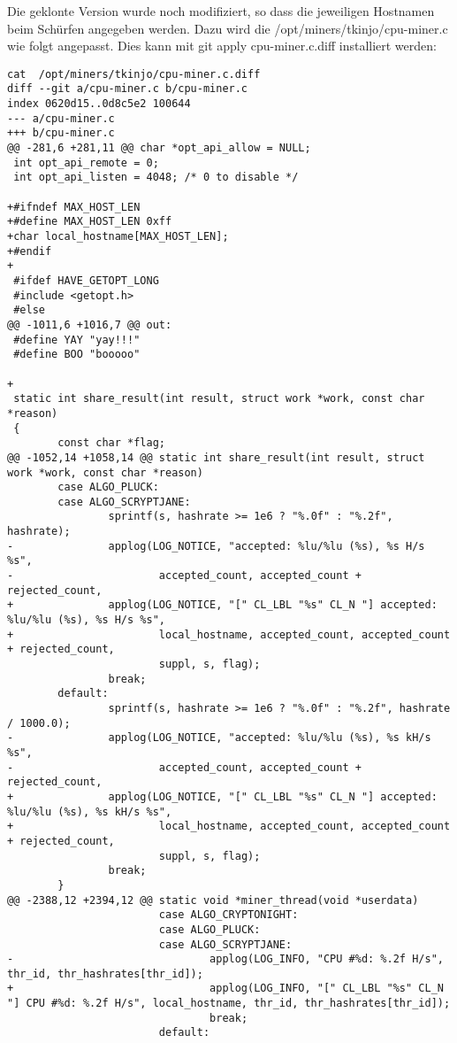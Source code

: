 Die geklonte Version wurde noch modifiziert, so dass die jeweiligen Hostnamen beim Schürfen angegeben werden. Dazu wird die /opt/miners/tkinjo/cpu-miner.c wie folgt angepasst. Dies kann mit git apply cpu-miner.c.diff installiert werden:
\begin{lstlisting}
cat  /opt/miners/tkinjo/cpu-miner.c.diff
diff --git a/cpu-miner.c b/cpu-miner.c
index 0620d15..0d8c5e2 100644
--- a/cpu-miner.c
+++ b/cpu-miner.c
@@ -281,6 +281,11 @@ char *opt_api_allow = NULL;
 int opt_api_remote = 0;
 int opt_api_listen = 4048; /* 0 to disable */

+#ifndef MAX_HOST_LEN
+#define MAX_HOST_LEN 0xff
+char local_hostname[MAX_HOST_LEN];
+#endif
+
 #ifdef HAVE_GETOPT_LONG
 #include <getopt.h>
 #else
@@ -1011,6 +1016,7 @@ out:
 #define YAY "yay!!!"
 #define BOO "booooo"

+
 static int share_result(int result, struct work *work, const char *reason)
 {
        const char *flag;
@@ -1052,14 +1058,14 @@ static int share_result(int result, struct work *work, const char *reason)
        case ALGO_PLUCK:
        case ALGO_SCRYPTJANE:
                sprintf(s, hashrate >= 1e6 ? "%.0f" : "%.2f", hashrate);
-               applog(LOG_NOTICE, "accepted: %lu/%lu (%s), %s H/s %s",
-                       accepted_count, accepted_count + rejected_count,
+               applog(LOG_NOTICE, "[" CL_LBL "%s" CL_N "] accepted: %lu/%lu (%s), %s H/s %s",
+                       local_hostname, accepted_count, accepted_count + rejected_count,
                        suppl, s, flag);
                break;
        default:
                sprintf(s, hashrate >= 1e6 ? "%.0f" : "%.2f", hashrate / 1000.0);
-               applog(LOG_NOTICE, "accepted: %lu/%lu (%s), %s kH/s %s",
-                       accepted_count, accepted_count + rejected_count,
+               applog(LOG_NOTICE, "[" CL_LBL "%s" CL_N "] accepted: %lu/%lu (%s), %s kH/s %s",
+                       local_hostname, accepted_count, accepted_count + rejected_count,
                        suppl, s, flag);
                break;
        }
@@ -2388,12 +2394,12 @@ static void *miner_thread(void *userdata)
                        case ALGO_CRYPTONIGHT:
                        case ALGO_PLUCK:
                        case ALGO_SCRYPTJANE:
-                               applog(LOG_INFO, "CPU #%d: %.2f H/s", thr_id, thr_hashrates[thr_id]);
+                               applog(LOG_INFO, "[" CL_LBL "%s" CL_N "] CPU #%d: %.2f H/s", local_hostname, thr_id, thr_hashrates[thr_id]);
                                break;
                        default:

\end{lstlisting}
